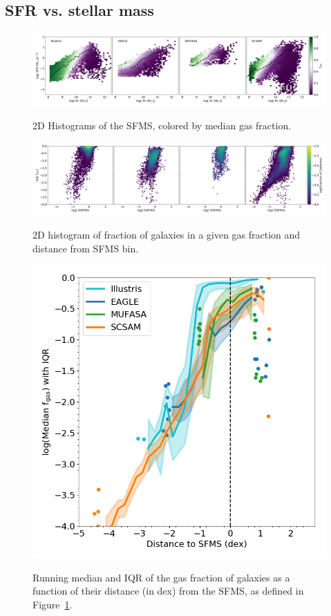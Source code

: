 \documentclass[fleqn,usenatbib]{mnras}
\begin{document}
\subsection{SFR vs. stellar mass}
\label{sec:results:SFMS fgas}


\begin{figure}
\includegraphics[width = 0.99\linewidth]{SFMS_fits_2dhist_median.png}\\
\caption{2D Histograms of the SFMS, colored by median gas fraction. }
\label{fig:SFMS fgas}
\end{figure}

\begin{figure}
\includegraphics[width = 0.99\linewidth]{fgas_DSFMS_2dhist_count_log_fgas.png}\\
\caption{2D histogram of fraction of galaxies in a given gas fraction and distance from SFMS bin.}
\label{fig:fgas DSFMS panel}
\end{figure}

\begin{figure}
\includegraphics[width = 0.99\linewidth]{fgas_DSFMS_binned_IQR_logged.png}\\
\caption{Running median and IQR of the gas fraction of galaxies as a function of their distance (in dex) from the SFMS, as defined in Figure~\ref{fig:SFMS fgas}.}
\label{fig:fgas DSFMS}
\end{figure}
\end{document}
